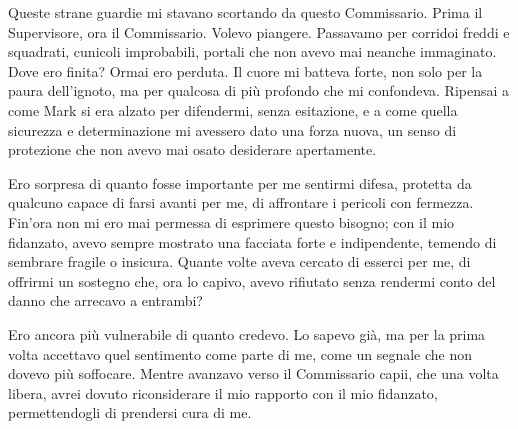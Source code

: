 Queste strane guardie mi stavano scortando da questo Commissario. Prima il Supervisore, ora il Commissario. Volevo piangere. Passavamo per  corridoi freddi e squadrati, cunicoli improbabili, portali che non avevo mai neanche immaginato. Dove ero finita? Ormai ero perduta. Il cuore mi batteva forte, non solo per la paura dell'ignoto, ma per qualcosa di più profondo che mi confondeva. Ripensai a come Mark si era alzato per difendermi, senza esitazione, e a come quella sicurezza e determinazione mi avessero dato una forza nuova, un senso di protezione che non avevo mai osato desiderare apertamente.

Ero sorpresa di quanto fosse importante per me sentirmi difesa, protetta da qualcuno capace di farsi avanti per me, di affrontare i pericoli con fermezza. Fin'ora non  mi ero mai permessa di esprimere questo bisogno; con il mio fidanzato, avevo sempre mostrato una facciata forte e indipendente, temendo di sembrare fragile o insicura. Quante volte aveva cercato di esserci per me, di offrirmi un sostegno che, ora lo capivo, avevo rifiutato senza rendermi conto del danno che arrecavo a entrambi?

Ero ancora più vulnerabile di quanto credevo. Lo sapevo già, ma per la prima volta accettavo quel sentimento come parte di me, come un segnale che non dovevo più soffocare. Mentre avanzavo verso il Commissario capii, che  una volta libera, avrei dovuto riconsiderare il mio rapporto con il mio fidanzato, permettendogli di prendersi cura di me.
